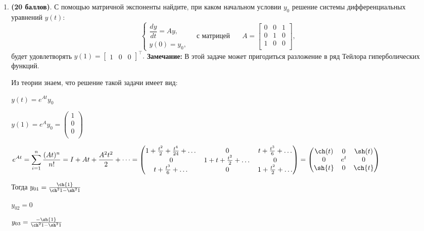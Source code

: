 \documentclass[a4paper, 11pt]{article}
\newcommand{\prob}[1]{\item \textbf{(#1 баллов)}.}
\begin{document}
\begin{enumerate}
		\prob{20} С помощью матричной экспоненты найдите, при каком начальном условии $y_0$ решение системы дифференциальных уравнений $y(t)$:
		\[
		\begin{cases}
			\dfrac{dy}{dt} = Ay, \\ 
			y(0) = y_0,
		\end{cases}
		\quad 
		\text{с матрицей } 
		\quad \ \ 
		A = 
		\begin{bmatrix}
			0 & 0 & 1 \\
			0 & 1 & 0 \\
			1 & 0 & 0\\
		\end{bmatrix},
		\]
		будет удовлетворять
		$
		y(1) = 
		\begin{bmatrix}
			1 & 0 & 0
		\end{bmatrix}^\top.
		$
		\textbf{Замечание:} В этой задаче может пригодиться разложение в ряд Тейлора гиперболических функций.
		
			Из теории знаем, что решение такой задачи имеет вид:
		
			$y(t) = e^{At} y_0$
			
			$y(1) = e^{A} y_0 = \begin{pmatrix}
				1 \\
				0 \\
				0 \\
			\end{pmatrix}$
			
			$\displaystyle e^{At} = \sum_{i = 1}^{n}  \frac{(At)^n}{n!} = I + At + \frac{A^2 t^2}{2} + \dots = \begin{pmatrix}
				1 + \frac{t^2}{2} + \frac{t^4}{24} + \dots & 0 & t + \frac{t^3}{6} + \dots \\
				0 & 1 + t + \frac{t^2}{2} + \dots & 0 \\
				t + \frac{t^3}{6} + \dots & 0 & 1 + \frac{t^2}{2} + \dots \\
			\end{pmatrix} = \begin{pmatrix}
			\ch(t) & 0 & \sh(t) \\
			0 & e^t & 0 \\ 
			\sh{t} & 0 & \ch{t} \\
			\end{pmatrix}$
			
			Тогда $y_{01} = \frac{\ch{1}}{\ch^2{1} - \sh^2{1}}$
			
			$y_{02} = 0$
			
			$y_{03} = \frac{-\sh{1}}{\ch^2{1} - \sh^2{1}}$
			

\end{enumerate}
\end{document}
